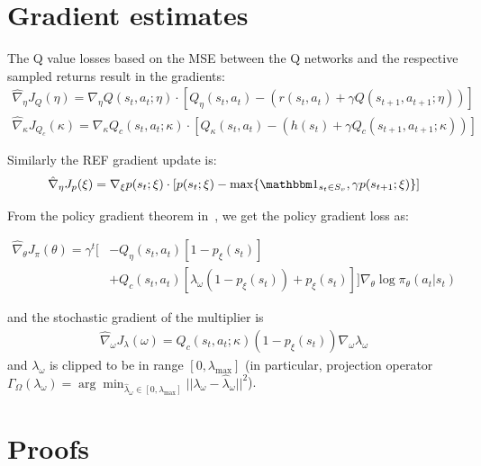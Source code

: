 \documentclass{article}
\theoremstyle{definition}
\begin{document}
\section{Gradient estimates}
\label{sec:Gradient}
The Q value losses based on the MSE between the Q networks and the respective sampled returns result in the gradients:
\begin{align*}
    \hat{\nabla}_\eta J_{Q}(\eta) = \nabla_\eta Q(s_t,a_t;\eta)\cdot [Q_\eta(s_t, a_t) - (r(s_t, a_t) + \gamma Q(s_{t+1}, a_{t+1};\eta))] \\
    \hat{\nabla}_\kappa J_{Q_c}(\kappa) = \nabla_\kappa Q_c(s_t,a_t;\kappa)\cdot [Q_\kappa(s_t, a_t) - (h(s_t) + \gamma Q_c(s_{t+1}, a_{t+1};\kappa))]
\end{align*}

Similarly the REF gradient update is:
\begin{align*}
    \hat{\nabla}_\eta J_{p}(\xi) = \nabla_\xi p(s_t;\xi)\cdot [p(s_t;\xi) - \max\{\mathbbm 1_{s_t\in S_v}, \gamma p(s_{t+1};\xi)\}]
\end{align*}


From the policy gradient theorem in~\cite{SuttonRL}, we get the policy gradient loss as:

\begin{align*}
    \hat{\nabla}_\theta J_\pi(\theta) = \gamma^t \bigg[&-Q_\eta(s_t,a_t) [1 - p_\xi(s_t)] \\
    &+Q_c(s_t,a_t) [\lambda_\omega (1 - p_\xi(s_t)) + p_\xi(s_t)]\bigg] \nabla_\theta \log\pi_\theta (a_t | s_t)
\end{align*}

and the stochastic gradient of the multiplier is
\begin{align*}
    \hat{\nabla}_\omega J_\lambda(\omega) = Q_c(s_t,a_t;\kappa)(1-p_\xi(s_t)) \nabla_\omega \lambda_\omega
\end{align*}
and $\lambda_\omega$ is clipped to be in range $[0,\lambda_{\max}]$ (in particular, projection operator $\Gamma_\Omega(\lambda_\omega)=\arg\min_{\hat{\lambda}_\omega\in [0,\lambda_{\max}]} || \lambda_\omega - \hat{\lambda}_\omega||^2$).



\section{Proofs}
\end{document}
